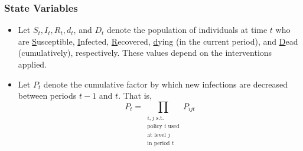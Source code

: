 \documentclass{article}
\begin{document}
\subsubsection*{State Variables}
\begin{itemize}
    \item Let $S_t, I_t, R_t, d_t$, and $D_t$ denote the population of individuals at time $t$ who are \underline{S}usceptible, \underline{I}nfected, \underline{R}ecovered, \underline{d}ying (in the current period), and \underline{D}ead (cumulatively), respectively. These values depend on the interventions applied.
    \item Let $P_t$ denote the cumulative factor by which new infections are decreased between periods $t-1$ and $t$. That is,
          \begin{equation}\label{eq:Pt_definition}\tag{6a}
              P_t = \prod_{\substack{i,j \text{ s.t.}\\\text{policy $i$ used}\\\text{at level $j$}\\\text{in period $t$}}}P_{ijt}
          \end{equation}

\end{itemize}
\end{document}
